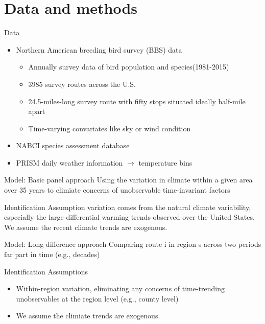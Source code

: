 \documentclass[handout]{beamer}
\begin{document}
\section{Data and methods}
\begin{frame}{Data}
  \begin{itemize}
    \item Northern American breeding bird survey (BBS) data
    \hyperlink{BBS routes}{}
    \begin{itemize}
      \item
      Annually survey data of bird population and species(1981-2015)
      \item
      3985 survey routes across the U.S.
      \item
      24.5-miles-long survey route with fifty stops situated ideally half-mile apart
      \item
      Time-varying convariates like sky or wind condition
    \end{itemize}
    \item NABCI species assessment database
    \item PRISM daily weather information $\rightarrow$ temperature bins
    \hyperlink{Temperature bins}{}
  \end{itemize}
\end{frame}


\begin{frame}{Model: Basic panel approach}
    Using the variation in climate within a given area over 35 years to elimiate concerns of unobservable time-invariant factors
    \begin{block}{Identification Assumption}
    variation comes from the natural climate variability, especially the large differential warming trends observed over the United States. We assume the recent climate trends are exogenous.
   \end{block}
\end{frame}




\begin{frame}{Model: Long difference approach}
    Comparing route i in region s across two periods far part in time (e.g., decades)
    \begin{block}{Identification Assumptions}
      \begin{itemize}
        \item Within-region variation, eliminating any concerns of time-trending unobservables at the region level (e.g., county level)
        \item We assume the climiate trends are exogenous.
      \end{itemize}
    \end{block}
\end{frame}
\end{document}

